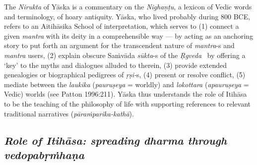The \textit{Nirukta} of Yāska is a commentary on the \textit{Nighaṇṭu}, a lexicon of Vedic words and terminology, of hoary antiquity. Yāska, who lived probably during 800 BCE, refers to an Aitihāsika School of interpretation, which serves to (1) connect a given \textit{mantra} with its deity in a comprehensible way — by acting as an anchoring story to put forth an argument for the transcendent nature of \textit{mantra}-s and \textit{mantra} users, (2) explain obscure Saṁvāda \textit{sūkta}-s of the \textit{Ṛgveda}  by offering a ‘key’ to the myths and dialogues alluded to therein, (3) provide extended genealogies or biographical pedigrees of \hbox{\textit{ṛṣi-}s}, (4) present or resolve conflict, (5) mediate between the \textit{laukika} (\textit{pauruṣeya} = worldly) and \textit{lokottara} (\textit{apauruṣeya} = Vedic) worlds (see Patton 1996:211). Yāska thus understands the role of Itihāsa to be the teaching of the philosophy of life with supporting references to relevant traditional narratives (\textit{pāraṁparika-kathā}).

\subsection*{\textit{Role of Itihāsa: spreading dharma through vedopabṛṁhaṇa}}

